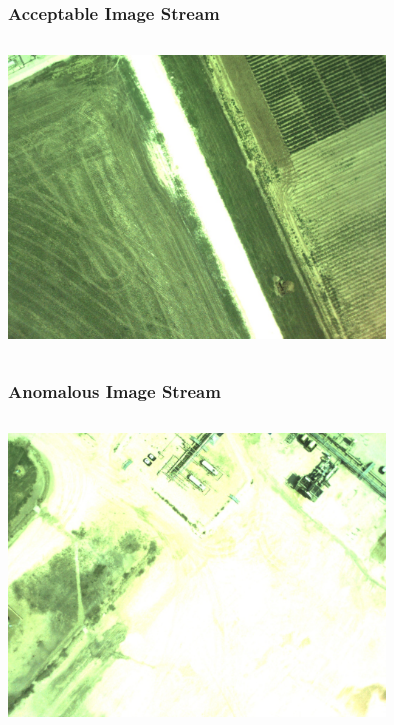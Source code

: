 \documentclass{beamer}
\begin{document}
\begin{frame} [noframenumbering]
\frametitle{Acceptable Image Stream}
\begin{columns}
\begin{centering}
\includegraphics[width = 10cm]{Figures/good5}
\end{centering}
\end{columns}
\end{frame}


\begin{frame}
\frametitle{Anomalous Image Stream}
\begin{columns}
\begin{centering}
\includegraphics[width = 10cm]{Figures/bad1}
\end{centering}
\end{columns}
\end{frame}
\end{document}
